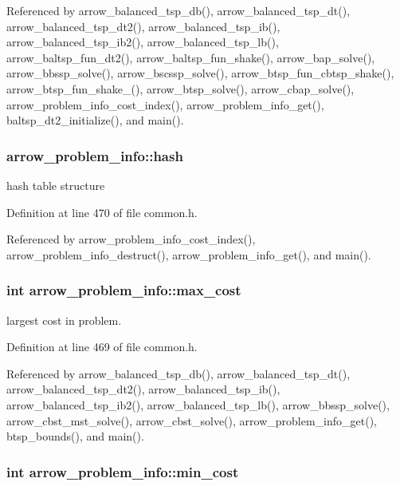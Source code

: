 Referenced by arrow\_\-balanced\_\-tsp\_\-db(), arrow\_\-balanced\_\-tsp\_\-dt(), arrow\_\-balanced\_\-tsp\_\-dt2(), arrow\_\-balanced\_\-tsp\_\-ib(), arrow\_\-balanced\_\-tsp\_\-ib2(), arrow\_\-balanced\_\-tsp\_\-lb(), arrow\_\-baltsp\_\-fun\_\-dt2(), arrow\_\-baltsp\_\-fun\_\-shake(), arrow\_\-bap\_\-solve(), arrow\_\-bbssp\_\-solve(), arrow\_\-bscssp\_\-solve(), arrow\_\-btsp\_\-fun\_\-cbtsp\_\-shake(), arrow\_\-btsp\_\-fun\_\-shake\_(), arrow\_\-btsp\_\-solve(), arrow\_\-cbap\_\-solve(), arrow\_\-problem\_\-info\_\-cost\_\-index(), arrow\_\-problem\_\-info\_\-get(), baltsp\_\-dt2\_\-initialize(), and main().\hypertarget{structarrow__problem__info_d62672139bdce70b23d8c72ecd96ff0d}{
\subsubsection[{hash}]{ {\bf arrow\_\-problem\_\-info::hash}}}
\label{structarrow__problem__info_d62672139bdce70b23d8c72ecd96ff0d}


hash table structure 

Definition at line 470 of file common.h.

Referenced by arrow\_\-problem\_\-info\_\-cost\_\-index(), arrow\_\-problem\_\-info\_\-destruct(), arrow\_\-problem\_\-info\_\-get(), and main().\hypertarget{structarrow__problem__info_724060f3be25521cca761899913c2776}{
\subsubsection[{max\_\-cost}]{\setlength{\rightskip}{0pt plus 5cm}int {\bf arrow\_\-problem\_\-info::max\_\-cost}}}
\label{structarrow__problem__info_724060f3be25521cca761899913c2776}


largest cost in problem. 

Definition at line 469 of file common.h.

Referenced by arrow\_\-balanced\_\-tsp\_\-db(), arrow\_\-balanced\_\-tsp\_\-dt(), arrow\_\-balanced\_\-tsp\_\-dt2(), arrow\_\-balanced\_\-tsp\_\-ib(), arrow\_\-balanced\_\-tsp\_\-ib2(), arrow\_\-balanced\_\-tsp\_\-lb(), arrow\_\-bbssp\_\-solve(), arrow\_\-cbst\_\-mst\_\-solve(), arrow\_\-cbst\_\-solve(), arrow\_\-problem\_\-info\_\-get(), btsp\_\-bounds(), and main().\hypertarget{structarrow__problem__info_46fabcc0ccd3a732cebb014331d4eeb5}{
\subsubsection[{min\_\-cost}]{\setlength{\rightskip}{0pt plus 5cm}int {\bf arrow\_\-problem\_\-info::min\_\-cost}}}
\label{structarrow__problem__info_46fabcc0ccd3a732cebb014331d4eeb5}



